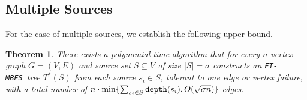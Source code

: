\documentclass[12pt]{article}
\newtheorem{theorem}{Theorem}[section]
\def\depth{\mbox{\tt depth}}
\def\NSource{\sigma}
\def\FTMBFS{\mbox{\tt FT-MBFS}}
\def\FTBFS{\mbox{\tt FT-BFS}}
\begin{document}
\subsection{Multiple Sources}
\label{subsec:multisource}
For the case of multiple sources, we establish the following upper bound.
\begin{theorem}
\label{thm:multi_source_edgeonef}
There exists a polynomial time algorithm that for every $n$-vertex graph
$G=(V,E)$ and source set $S \subseteq V$ of size $|S|=\NSource$ constructs
an \FTMBFS\ tree $T^*(S)$ from each source $s_i \in S$,
tolerant to one edge or vertex failure,
with a total number of
$n\cdot \min\{\sum_{s_i \in S} \depth(s_i),O(\sqrt{\NSource n})\}$ edges.
\end{theorem}
\def\APPENDUPPERMULTI{

\paragraph{The algorithm}
As in the single source case, to avoid complications due to shortest-paths
of the same length, all shortest path distances in $G$ are computed using
a weight function $W$ defined so as to ensure the uniqueness of a single $u-v$
shortest-path.
For every $s_i \in S$ and every $e_{j} \in T_0(s_i)$, let $T(s_i, e_j)$ be the BFS tree rooted at $s_i$ in $G \setminus \{e_j\}$.
Let $$T_0(S)=\bigcup_{s_i \in S}T_0(s_i)$$
be the joint structure containing all the BFS trees of $S$.
Then by the previous section, the \FTBFS\ tree for $s_i$ is $T^*(s_i)=T_0 \cup \bigcup_{e_j \in T_0(s_i)}T(s_i, e_j)$. Define the \FTMBFS\ for $S$ as
$$T^*(S)=\bigcup_{s_i \in S}T^*(s_i)=\bigcup_{s_i \in S, e_{j} \in T_0(s_i)} T(s_i, e_j).$$

}
\end{document}
